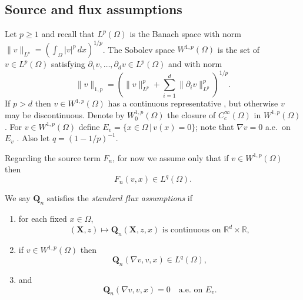 \documentclass[final,leqno,onefignum,onetabnum]{siamltex1213bueler}
\newcommand\bQ{\mathbf{Q}}
\newcommand\bX{\mathbf{X}}
\renewcommand{\grad}{\nabla}
\newcommand\RR{\mathbb{R}}
\begin{document}
\subsection{Source and flux assumptions} \label{subsec:fluxassumptions}  Let $p\ge 1$ and recall that $L^p (\Omega)$ is the Banach space with norm $\|v\|_{L^p} = \left(\int_\Omega |v|^p\,dx\right)^{1/p}$.  The Sobolev space $W^{1,p}(\Omega)$ \cite{Evans2010} is the set of $v \in L^p(\Omega)$ satisfying $\partial_1 v,\dots,\partial_d v \in L^p(\Omega)$ and with norm
\begin{equation}
  \|v\|_{1,p} = \left(\|v\|_{L^p}^p + \sum_{i=1}^d \|\partial_i v\|_{L^p}^p\right)^{1/p}.  \label{eq:norm}
\end{equation}
If $p>d$ then $v\in W^{1,p}(\Omega)$ has a continuous representative \cite[``Morrey's inequality'']{Evans2010}, but otherwise $v$ may be discontinuous.  Denote by $W_0^{1,p}(\Omega)$ the closure of $C_c^\infty(\Omega)$ in $W^{1,p}(\Omega)$.  For $v \in W^{1,p}(\Omega)$ define $E_v = \{x\in\Omega \,\big|\, v(x) = 0\}$; note that $\grad v = 0$ a.e.~on $E_v$ \cite[lemma A.4 in chapter II]{KinderlehrerStampacchia1980}.  Also let $q=(1-1/p)^{-1}$.

Regarding the source term $F_n$, for now we assume only that if $v\in W^{1,p}(\Omega)$ then
\begin{equation}
F_n(v,x) \in L^q(\Omega).  \label{eq:FisLq}
\end{equation}

\begin{definition}  \label{ass:std}  We say $\bQ_n$ satisfies the \emph{standard flux assumptions} if
\renewcommand{\labelenumi}{\emph{\roman{enumi}})}
\begin{enumerate}
\item for each fixed $x\in \Omega$,
\begin{equation}
(\bX,z) \mapsto \bQ_n(\bX,z,x) \text{ is continuous on } \RR^d \times \RR,  \label{eq:Qiscontinuous}
\end{equation}
\item if $v \in W^{1,p}(\Omega)$ then
\begin{equation}
\bQ_n(\grad v,v,x) \in L^q(\Omega), \label{eq:QisLq}
\end{equation}
\item and
\begin{equation}
\bQ_n(\grad v,v,x)=0 \quad \text{a.e.~on } E_v. \label{eq:Qiszero}
\end{equation}
\end{enumerate}
\end{definition}
\end{document}
